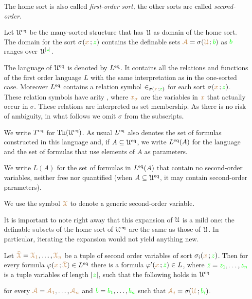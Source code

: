 \documentclass[creche.tex]{subfiles}
\begin{document}
The home sort is also called \emph{first-order sort,}
the other sorts are called \emph{second-order.}

Let \emph{$\EuScript U^{{{\rm eq}}}$\/} be the many-sorted structure that has $\EuScript U$ as domain of the home sort.
The domain for the sort $\sigma({\color{brown} x}\,;{\color{green} z})$ contains 
the definable sets ${\color{brown}\EuScript A}=\sigma({\color{brown}\EuScript U}\,;{\color{green} b})$ as ${\color{green} b}$ ranges over $\EuScript U^{|{\color{green} z}|}$.

The language of $\EuScript U^{{\rm eq}}$ is denoted by $L^{{\rm eq}}$.
It contains all the relations and functions of the first order language $L$ with the same interpretation as in the one-sorted case.  
Moreover $L^{{\rm eq}}$ contains a relation symbol $\in_{\sigma({\color{brown} x}\,;{\color{green} z})}$ for each sort $\sigma({\color{brown} x}\,;{\color{green} z})$.
These relation symbols have arity , where ${\color{brown} x_\sigma}$ are the variables in ${\color{brown} x}$ that actually occur in $\sigma$.
These relations are interpreted as set membership.
As there is no risk of ambiguity, in what follows we omit $\sigma$ from the subscripts.

We write \emph{$T^{{{\rm eq}}}$\/} for ${\rm Th}(\EuScript U^{{\rm eq}})$.
As usual \emph{$L^{{\rm eq}}$\/} also denotes the set of formulas constructed in this language and, if $A\subseteq\EuScript U^{{\rm eq}}$, we write  \emph{$L^{{\rm eq}}(A)$\/} for the language and the set of formulas that use elements of $A$ as parameters.

\noindent\llap{\textcolor{red}{\Large\warning}\kern1.5ex}We write \emph{$L(A)$\/} for the set of formulas in $L^{{\rm eq}}(A)$ that contain no second-order variables, neither free nor quantified (when $A\subseteq\EuScript U^{{\rm eq}}$, it may contain second-order parameters).

We use the symbol ${\color{brown}\EuScript X}$ to denote a generic second-order variable.


It is important to note right away that this expansion of $\EuScript U$ is a mild one: the definable subsets of the home sort of $\EuScript U^{{\rm eq}}$ are the same as those of $\EuScript U$.
In particular, iterating the expansion would not yield anything new.

\begin{proposition}\label{prop_eqmild}
Let ${\color{brown}\bar{\EuScript X}}={\color{brown}\EuScript X_1},\dots,{\color{brown}\EuScript X_n}$ be a tuple of second order variables of sort $\sigma_i({\color{brown} x}\,;{\color{green} z})$.
Then for every formula $\varphi({\color{brown} x}\,;{\color{brown}\bar {\EuScript X}})\in L^{{\rm eq}}$ there is a formula $\varphi'({\color{brown} x}\,;{\color{green}\bar z})\in L$, where ${\color{green}\bar z}={\color{green} z_1},\dots,{\color{green} z_n}$ is a tuple variables of length $|{\color{green} z}|$, such that the following holds in $\EuScript U^{{\rm eq}}$


for every ${\color{brown}\bar{\EuScript A}}={\color{brown}\EuScript A_1},\dots,{\color{brown}\EuScript A_n}$ and ${\color{green}\bar b}={\color{green} b_1},\dots,{\color{green} b_n}$ such that ${\color{brown}\EuScript A_i}=\sigma({\color{brown}\EuScript U}\,;{\color{green} b_i})$.

\end{proposition}
\end{document}

